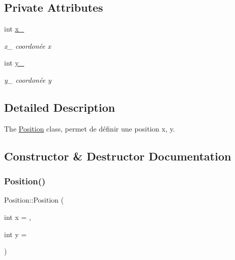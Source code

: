 \subsection*{Private Attributes}
\begin{DoxyCompactItemize}
\item 
\mbox{\label{class_position_a5eee55bf1718fb7c4f296930c38087fe}} 
int \mbox{\hyperlink{class_position_a5eee55bf1718fb7c4f296930c38087fe}{x\+\_\+}}
\begin{DoxyCompactList}\small\item\em x\+\_\+ coordonée x \end{DoxyCompactList}\item 
\mbox{\label{class_position_ac18ebbc60c7d67bb6b30fc1ef82948af}} 
int \mbox{\hyperlink{class_position_ac18ebbc60c7d67bb6b30fc1ef82948af}{y\+\_\+}}
\begin{DoxyCompactList}\small\item\em y\+\_\+ coordonée y \end{DoxyCompactList}\end{DoxyCompactItemize}


\subsection{Detailed Description}
The \mbox{\hyperlink{class_position}{Position}} class, permet de définir une position x, y. 

\subsection{Constructor \& Destructor Documentation}
\mbox{\label{class_position_aefa590074d28918732e477cf447d16b8}} 
\subsubsection{\texorpdfstring{Position()}{Position()}}
{\footnotesize\ttfamily Position\+::\+Position (\begin{DoxyParamCaption}\item[{int}]{x = {},  }\item[{int}]{y = {} }\end{DoxyParamCaption})\hspace{0.3cm}{\ttfamily [inline]}}



